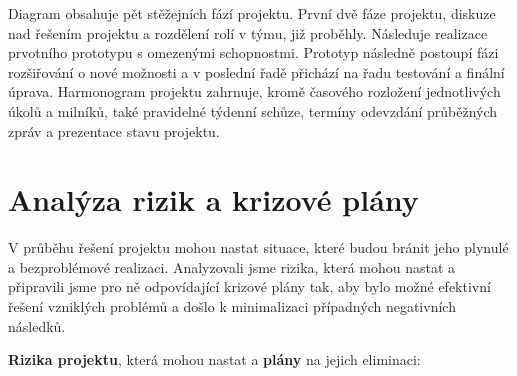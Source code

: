 \documentclass[12pt,a4paper]{article}
\begin{document}
Diagram obsahuje pět stěžejních fází projektu. První dvě fáze projektu, diskuze nad řešením projektu a rozdělení rolí v týmu, již proběhly. Následuje realizace prvotního prototypu s omezenými schopnostmi. Prototyp následně postoupí fázi rozšiřování o nové možnosti a v poslední řadě přichází na řadu testování a finální úprava. Harmonogram projektu zahrnuje, kromě časového rozložení jednotlivých úkolů a milníků, také pravidelné týdenní schůze, termíny odevzdání průběžných zpráv a prezentace stavu projektu.

\section*{Analýza rizik a krizové plány}
V průběhu řešení projektu mohou nastat situace, které budou bránit jeho plynulé a bezproblémové realizaci. Analyzovali jsme rizika, která mohou nastat a připravili jsme pro ně odpovídající krizové plány tak, aby bylo možné efektivní řešení vzniklých problémů a došlo k minimalizaci případných negativních následků.

\vspace{1em}
\noindent \textbf{Rizika projektu}, která mohou nastat a \textbf{plány} na jejich eliminaci: 
\end{document}

